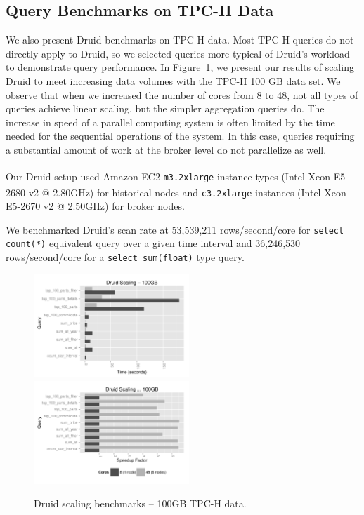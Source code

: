\documentclass{vldb}
\begin{document}
\subsection{Query Benchmarks on TPC-H Data}
We also present Druid benchmarks on TPC-H data.  Most TPC-H queries do not
directly apply to Druid, so we selected queries more typical of Druid's
workload to demonstrate query performance. In Figure~\ref{fig:tpch_scaling}, we
present our results of scaling Druid to meet increasing data volumes with the
TPC-H 100 GB data set. We observe that when we increased the number of cores
from 8 to 48, not all types of queries achieve linear scaling, but the simpler
aggregation queries do. The increase in speed of a parallel computing system is
often limited by the time needed for the sequential operations of the system.
In this case, queries requiring a substantial amount of work at the broker
level do not parallelize as well.

Our Druid setup used Amazon EC2 \texttt{m3.2xlarge} instance types
(Intel\textsuperscript{\textregistered} Xeon\textsuperscript{\textregistered}
E5-2680 v2 @ 2.80GHz) for historical nodes and \texttt{c3.2xlarge} instances
(Intel\textsuperscript{\textregistered} Xeon\textsuperscript{\textregistered}
E5-2670 v2 @ 2.50GHz) for broker nodes. 

We benchmarked Druid's scan rate at 53,539,211
rows/second/core for \texttt{select count(*)} equivalent query over a given
time interval and 36,246,530 rows/second/core for a \texttt{select sum(float)}
type query.

\begin{figure}
\centering
\includegraphics[width = 2.3in]{tpch_scaling}
\includegraphics[width = 2.3in]{tpch_scaling_factor}
\caption{Druid scaling benchmarks -- 100GB TPC-H data.}
\label{fig:tpch_scaling}
\end{figure}
\end{document}
